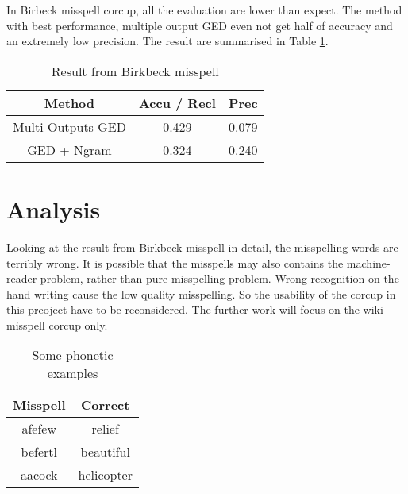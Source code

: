 \documentclass[11pt]{article}
\begin{document}
In Birbeck misspell corcup, all the evaluation are lower than expect. The method with best performance, multiple output GED even not get half of accuracy and an extremely low precision. The result are summarised in Table \ref{table2}.

\begin{table}[h]
\begin{center}
\begin{tabular}{|c|c|c|}

    \hline
    Method & Accu / Recl & Prec\\
	 \hline    
    Multi Outputs GED & 0.429 & 0.079\\
    \hline
    GED + Ngram & 0.324 & 0.240\\
    \hline
\end{tabular}
\caption{Result from Birkbeck misspell}
\label{table2}
\end{center}
\end{table}

\section{Analysis}
Looking at the result from Birkbeck misspell in detail, the misspelling words are terribly wrong. It is possible that the misspells may also contains the machine-reader problem, rather than pure misspelling problem. Wrong recognition on the hand writing cause the low quality misspelling. So the usability of the corcup in this preoject have to be reconsidered. The further work will focus on the wiki misspell corcup only.

\begin{table}[h]
\begin{center}
\begin{tabular}{|c|c|}
    \hline
    Misspell & Correct\\
    \hline
    \hline
    afefew & relief\\
	  \hline    
    befertl & beautiful\\
    \hline
    aacock & helicopter\\
    \hline
\end{tabular}
\caption{Some phonetic examples}
\label{table3}
\end{center}
\end{table}
\end{document}
